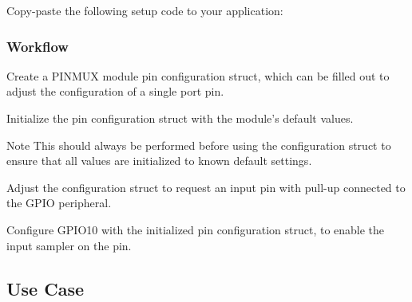 Copy-\/paste the following setup code to your application\+: 
\begin{DoxyCodeInclude}
\end{DoxyCodeInclude}
 \hypertarget{asfdoc_sam0_system_pinmux_basic_use_case_asfdoc_sam0_system_pinmux_basic_use_case_setup_flow}{}\subsubsection{Workflow}\label{asfdoc_sam0_system_pinmux_basic_use_case_asfdoc_sam0_system_pinmux_basic_use_case_setup_flow}

\begin{DoxyEnumerate}
\item Create a P\+I\+N\+M\+U\+X module pin configuration struct, which can be filled out to adjust the configuration of a single port pin. 
\begin{DoxyCodeInclude}
\end{DoxyCodeInclude}

\item Initialize the pin configuration struct with the module's default values. 
\begin{DoxyCodeInclude}
\end{DoxyCodeInclude}
 \begin{DoxyNote}{Note}
This should always be performed before using the configuration struct to ensure that all values are initialized to known default settings.
\end{DoxyNote}

\item Adjust the configuration struct to request an input pin with pull-\/up connected to the G\+P\+I\+O peripheral. 
\begin{DoxyCodeInclude}
\end{DoxyCodeInclude}

\item Configure G\+P\+I\+O10 with the initialized pin configuration struct, to enable the input sampler on the pin. 
\begin{DoxyCodeInclude}
\end{DoxyCodeInclude}
 
\end{DoxyEnumerate}\hypertarget{asfdoc_sam0_system_pinmux_basic_use_case_asfdoc_sam0_system_pinmux_basic_use_case_use_main}{}\subsection{Use Case}\label{asfdoc_sam0_system_pinmux_basic_use_case_asfdoc_sam0_system_pinmux_basic_use_case_use_main}
